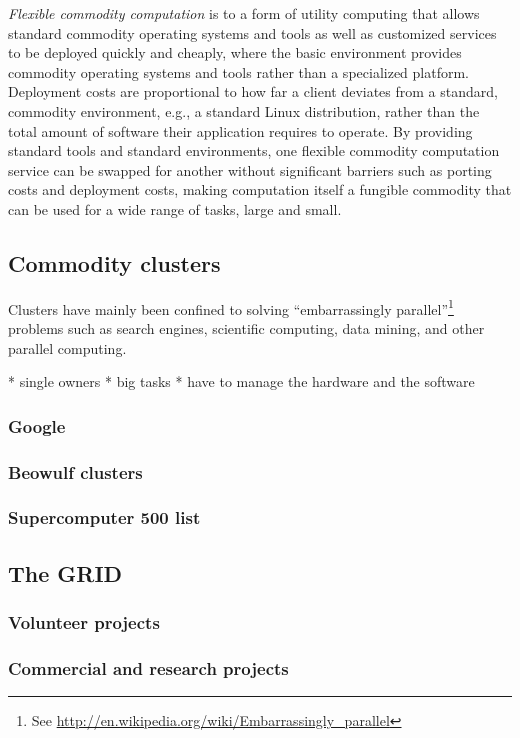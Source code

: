 \emph{Flexible commodity computation} is to a form of utility computing that allows standard commodity operating systems and tools as well as customized services to be deployed quickly and cheaply, where the basic environment provides commodity operating systems and tools rather than a specialized platform. Deployment costs are proportional to how far a client deviates from a standard, commodity environment, e.g., a standard Linux distribution, rather than the total amount of software their application requires to operate. By providing standard tools and standard environments, one flexible commodity computation service can be swapped for another without significant barriers such as porting costs and deployment costs, making computation itself a fungible commodity that can be used for a wide range of tasks, large and small.

\subsection{Commodity clusters}

Clusters have mainly been confined to solving ``embarrassingly parallel''\footnote{See \url{http://en.wikipedia.org/wiki/Embarrassingly_parallel}} problems such as search engines, scientific computing, data mining, and other parallel computing.

* single owners
* big tasks
* have to manage the hardware and the software

\subsubsection{Google}
\subsubsection{Beowulf clusters}
\subsubsection{Supercomputer 500 list}

\subsection{The GRID}

\subsubsection{Volunteer projects}
\subsubsection{Commercial and research projects}
